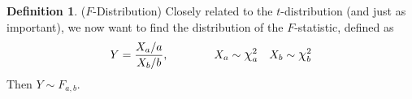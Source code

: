 \documentclass[12pt]{article}
\theoremstyle{plain}
\theoremstyle{definition}
\newtheorem{defn}[thm]{Definition}
\theoremstyle{remark}
\newcommand*{\Chi}{\mbox{\large$\chi$}} %
\begin{document}
\begin{defn}($F$-Distribution)
Closely related to the $t$-distribution (and just as important), we now
want to find the distribution of the $F$-statistic, defined as
\begin{align*}
  Y = \frac{ X_a / a}{X_b / b},\qquad\qquad
  X_a \sim \Chi^2_a
  \quad X_b \sim \Chi^2_b
\end{align*}
Then $Y\sim F_{a,b}$.
\end{defn}
\end{document}
